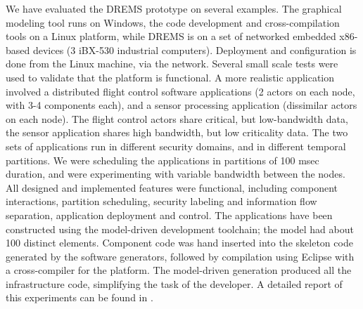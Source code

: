 We have evaluated the DREMS prototype on several examples. The graphical modeling
tool runs on Windows, the code development and cross-compilation tools on a Linux platform, 
while DREMS is on a set of networked embedded x86-based devices (3 iBX-530 industrial computers). 
Deployment and configuration is done from the Linux machine, via the network. 
Several small scale tests were used to validate that the platform is functional. A more
realistic application involved a distributed flight control software applications (2 actors on each node,
with 3-4 components each), and a sensor processing application (dissimilar actors on each node). The flight control
actors share critical, but low-bandwidth data, the sensor application shares high bandwidth, but low criticality data. The two sets of applications run in different security domains, and in different temporal partitions. We were scheduling the applications in partitions of 100 msec duration, and were experimenting with variable bandwidth between the nodes. All designed and implemented features were functional, including component interactions, partition scheduling, security labeling and information flow separation, application deployment and control. The applications have been constructed using the model-driven development toolchain; the model had about 100 distinct elements. Component code was hand inserted into the skeleton code generated by the software generators, followed by compilation using Eclipse with a cross-compiler for the platform. The model-driven generation produced all the infrastructure code, simplifying the task of the developer. A detailed report of this experiments can be found in \cite{drems-rtss-2013}.
